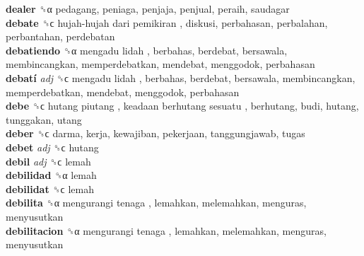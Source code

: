 \textbf{dealer} ␝α  pedagang, peniaga, penjaja, penjual, peraih, saudagar  \\
\textbf{debate} ␝ϲ   hujah-hujah dari pemikiran , diskusi, perbahasan, perbalahan, perbantahan, perdebatan  \\
\textbf{debatiendo} ␝α   mengadu lidah , berbahas, berdebat, bersawala, membincangkan, memperdebatkan, mendebat, menggodok, perbahasan  \\
\textbf{debatí} \emph{adj}  ␝ϲ   mengadu lidah , berbahas, berdebat, bersawala, membincangkan, memperdebatkan, mendebat, menggodok, perbahasan  \\
\textbf{debe} ␝ϲ   hutang piutang ,  keadaan berhutang sesuatu , berhutang, budi, hutang, tunggakan, utang  \\
\textbf{deber} ␝ϲ  darma, kerja, kewajiban, pekerjaan, tanggungjawab, tugas  \\
\textbf{debet} \emph{adj}  ␝ϲ  hutang  \\
\textbf{debil} \emph{adj}  ␝ϲ  lemah  \\
\textbf{debilidad} ␝α  lemah  \\
\textbf{debilidat} ␝ϲ  lemah  \\
\textbf{debilita} ␝α   mengurangi tenaga , lemahkan, melemahkan, menguras, menyusutkan  \\
\textbf{debilitacion} ␝α   mengurangi tenaga , lemahkan, melemahkan, menguras, menyusutkan  \\
